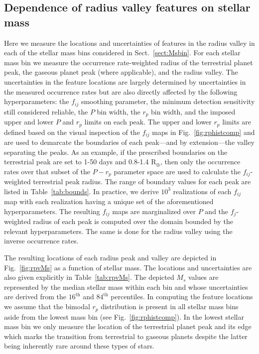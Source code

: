 \documentclass[twocolumn]{emulateapj}
\begin{document}
\subsection{Dependence of radius valley features on stellar mass}
Here we measure the locations and uncertainties of features in the radius valley in each of the stellar
mass bins considered in Sect.~\ref{sect:Msbin}. For each stellar mass bin
we measure the occurrence rate-weighted radius of the terrestrial planet peak,
the gaseous planet peak (where applicable), and the radius valley. The uncertainties in the feature locations
are largely determined by uncertainties in the measured occurrence rates but are also directly affected by
the following hyperparameters: the $f_{ij}$ smoothing parameter, the minimum detection sensitivity still
considered reliable,
the $P$ bin width, the $r_p$ bin width, and the imposed upper and
lower $P$ and $r_p$ limits on each peak. The upper and lower $r_p$ limits are defined based on the visual
inspection of the $f_{ij}$ maps in Fig.~\ref{fig:rphistcomp} and are used to demarcate the
boundaries of each peak---and by extension---the valley separating the peaks.
As an example, if the prescribed boundaries on the terrestrial peak are set to 1-50 days and 0.8-1.4 R$_{\oplus}$,
then only the occurrence rates over that subset of the $P-r_p$ parameter space are used to calculate the
$f_{ij}$-weighted terrestrial peak radius. The range of boundary values for each peak are listed in
Table~\ref{tab:bounds}. In practice, we derive $10^3$ realizations of each $f_{ij}$ map with each realization
having a unique set of the aforementioned hyperparameters.
The resulting $f_{ij}$ maps are marginalized over $P$ and the $f_j$-weighted radius of
each peak is computed over the domain bounded by the relevant hyperparameters.
The same is done for the radius valley using the inverse occurrence rates.



The resulting locations of each radius peak and valley are depicted in Fig.~\ref{fig:rpvMs} as a function of
stellar mass. The locations and uncertainties are also given explicitly in Table~\ref{tab:rpvMs}.
The depicted $M_s$ values are represented by the median stellar mass within each bin and whose
uncertainties are derived from the $16^{\text{th}}$ and $84^{\text{th}}$ percentiles. In computing the
feature locations we assume that the bimodal $r_p$ distribution is present in all stellar mass bins
aside from the lowest mass bin (see Fig.~\ref{fig:rphistcomp}). In the lowest stellar mass bin we
only measure the location of the terrestrial planet peak and its edge which marks the transition from
terrestrial to gaseous planets despite the latter being inherently rare around these types of stars.
\end{document}

